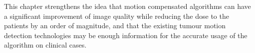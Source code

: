 This chapter strengthens the idea that motion compensated algorithms can have a significant improvement of image quality while reducing the dose to the patients by an order of magnitude, and that the existing tumour motion detection technologies may be enough information for the accurate usage of the algorithm on clinical cases. 




